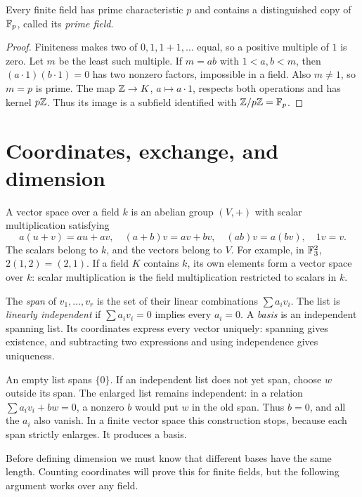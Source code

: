\begin{proposition}
Every finite field has prime characteristic $p$ and contains a distinguished
copy of $\mathbb F_p$, called its \emph{prime field}.
\end{proposition}
\begin{proof}
Finiteness makes two of $0,1,1+1,\ldots$ equal, so a positive multiple
of $1$ is zero. Let $m$ be the least such multiple. If $m=ab$ with
$1<a,b<m$, then $(a\cdot1)(b\cdot1)=0$ has two nonzero factors,
impossible in a field. Also $m\ne1$, so $m=p$ is prime. The map
$\mathbb Z\to K$, $a\mapsto a\cdot1$, respects both operations and has kernel
$p\mathbb Z$. Thus its image is a subfield identified with $\mathbb Z/p\mathbb Z=\mathbb F_p$.
\end{proof}

\section{Coordinates, exchange, and dimension}
\label{sec:finite-field-dimension}

A vector space over a field $k$ is an abelian group $(V,+)$ with scalar
multiplication satisfying
\[
a(u+v)=au+av,\quad (a+b)v=av+bv,\quad
(ab)v=a(bv),\quad 1v=v.
\]
The scalars belong to $k$, and the vectors belong to $V$. For example,
in $\mathbb F_3^2$, $2(1,2)=(2,1)$. If a field $K$ contains $k$, its own
elements form a vector space over $k$: scalar multiplication is the
field multiplication restricted to scalars in $k$.

\begin{definition}
The \emph{span} of $v_1,\ldots,v_r$ is the set of their linear
combinations $\sum a_iv_i$. The list is \emph{linearly independent} if
$\sum a_iv_i=0$ implies every $a_i=0$. A \emph{basis} is an independent
spanning list. Its coordinates express every vector uniquely:
spanning gives existence, and subtracting two expressions and using
independence gives uniqueness.
\end{definition}

An empty list spans $\{0\}$. If an independent list does not yet span,
choose $w$ outside its span. The enlarged list remains independent:
in a relation $\sum a_iv_i+bw=0$, a nonzero $b$ would put $w$ in the old
span. Thus $b=0$, and all the $a_i$ also vanish. In a finite vector
space this construction stops, because each span strictly enlarges.
It produces a basis.

Before defining dimension we must know that different bases have the
same length. Counting coordinates will prove this for finite fields,
but the following argument works over any field.


